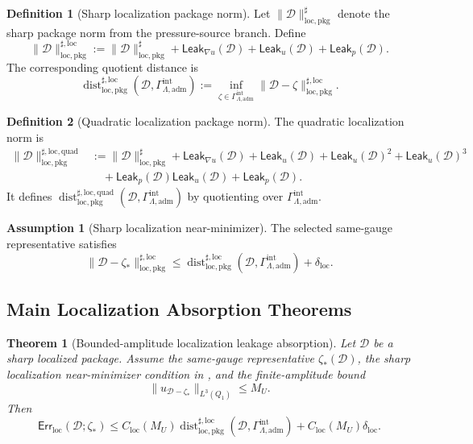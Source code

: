 \documentclass[11pt]{article}
\numberwithin{equation}{section}
\newtheorem{theorem}{Theorem}[section]
\theoremstyle{definition}
\newtheorem{definition}[definition]{Definition}
\newtheorem{assumption}[assumption]{Assumption}
\theoremstyle{remark}
\newcommand{\loc}{\mathrm{loc}}
\newcommand{\pkg}{\mathrm{pkg}}
\newcommand{\adm}{\mathrm{adm}}
\newcommand{\quadg}{\mathrm{quad}}
\newcommand{\Err}{\mathsf{Err}}
\newcommand{\Leak}{\mathsf{Leak}}
\newcommand{\Dist}{\operatorname{dist}}
\newcommand{\calD}{\mathcal D}
\newcommand{\Qone}{Q_1}
\newcommand{\Gadm}{\Gamma^{\mathrm{int}}_{\Lambda,\adm}}
\begin{document}
\begin{definition}[Sharp localization package norm]
\label{loc:def:sharp-localization-norm}
Let \(\|\calD\|_{\loc,\pkg}^{\sharp}\) denote the sharp package norm from the
pressure-source branch.  Define
\[
    \|\calD\|_{\loc,\pkg}^{\sharp,\loc}
    :=
    \|\calD\|_{\loc,\pkg}^{\sharp}
    +
    \Leak_{\nabla u}(\calD)
    +
    \Leak_u(\calD)
    +
    \Leak_p(\calD).
\]
The corresponding quotient distance is
\[
    \Dist_{\loc,\pkg}^{\sharp,\loc}(\calD,\Gadm)
    :=
    \inf_{\zeta\in\Gadm}
    \|\calD-\zeta\|_{\loc,\pkg}^{\sharp,\loc}.
\]
\end{definition}

\begin{definition}[Quadratic localization package norm]
\label{loc:def:quadratic-localization-norm}
The quadratic localization norm is
\[
\begin{aligned}
    \|\calD\|_{\loc,\pkg}^{\sharp,\loc,\quadg}
    &:=
    \|\calD\|_{\loc,\pkg}^{\sharp}
    +
    \Leak_{\nabla u}(\calD)
    +
    \Leak_u(\calD)
    +
    \Leak_u(\calD)^2
    +
    \Leak_u(\calD)^3
\\
    &\quad+
    \Leak_p(\calD)\Leak_u(\calD)
    +
    \Leak_p(\calD).
\end{aligned}
\]
It defines
\(\Dist_{\loc,\pkg}^{\sharp,\loc,\quadg}(\calD,\Gadm)\) by quotienting over
\(\Gadm\).
\end{definition}

\begin{assumption}[Sharp localization near-minimizer]
\label{loc:ass:loc-near-minimizer}
The selected same-gauge representative satisfies
\[
    \|\calD-\zeta_*\|_{\loc,\pkg}^{\sharp,\loc}
    \le
    \Dist_{\loc,\pkg}^{\sharp,\loc}(\calD,\Gadm)
    +
    \delta_{\loc}.
\]
\end{assumption}

\subsection{Main Localization Absorption Theorems}
\label{loc:sec:main-theorems}

\begin{theorem}[Bounded-amplitude localization leakage absorption]
\label{loc:thm:bounded-amplitude-localization-absorption}
Let \(\calD\) be a sharp localized package.  Assume the same-gauge
representative \(\zeta_*(\calD)\), the sharp localization near-minimizer
condition in , and the finite-amplitude bound
\[
    \|u_{\calD-\zeta_*}\|_{L^3(\Qone)}
    \le
    M_U.
\]
Then
\[
    \Err_{\loc}(\calD;\zeta_*)
    \le
    C_{\loc}(M_U)
    \Dist_{\loc,\pkg}^{\sharp,\loc}(\calD,\Gadm)
    +
    C_{\loc}(M_U)\delta_{\loc}.
\]
\end{theorem}
\end{document}
